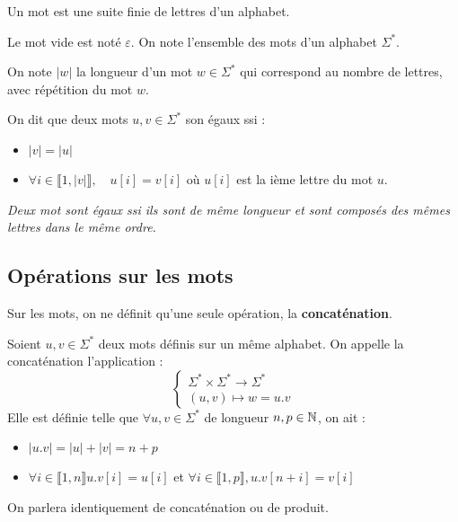 \begin{definition}[Mot]
    Un mot est une suite finie de lettres d'un alphabet. 
\end{definition}

\begin{proposition}
    Le mot vide est noté $\varepsilon$. On note l'ensemble des mots d'un alphabet $\Sigma^*$. 
\end{proposition}

\begin{definition}
    On note $|w|$ la longueur d'un mot $w \in \Sigma^*$ qui correspond au nombre de lettres, avec répétition du mot $w$. 
\end{definition}

\begin{definition}
    On dit que deux mots $u,v \in \Sigma^*$ son égaux ssi :
    \begin{itemize}
        \item $|v| = |u|$ 
        \item $\forall i \in \llbracket 1, |v| \rrbracket, \quad u[i] = v[i]$ où $u[i]$ est la ième lettre du mot $u$. 
    \end{itemize}
    \emph{Deux mot sont égaux ssi ils sont de même longueur et sont composés des mêmes lettres dans le même ordre.}
\end{definition}

\subsection{Opérations sur les mots}

Sur les mots, on ne définit qu'une seule opération, la \textbf{concaténation}. 

\begin{definition}[Concaténation]
    Soient $u,v \in \Sigma^*$ deux mots définis sur un même alphabet. On appelle la concaténation l'application :
    \[
        \begin{cases}
            \Sigma^* \times \Sigma^* \longrightarrow \Sigma^* \\ 
            (u,v) \longmapsto w = u.v
        \end{cases}
    \]
    Elle est définie telle que $ \forall u,v \in \Sigma^*$ de longueur $n,p \in \mathbb{N}$, on ait :
    \begin{itemize}
        \item $ |u.v| = |u| + |v| = n + p $
        \item $ \forall i \in \llbracket 1, n \rrbracket u.v[i] = u[i] $ et $ \forall i \in \llbracket 1,p \rrbracket, u.v[n+i] = v[i] $  
    \end{itemize}
    On parlera identiquement de concaténation ou de produit. 
\end{definition}

